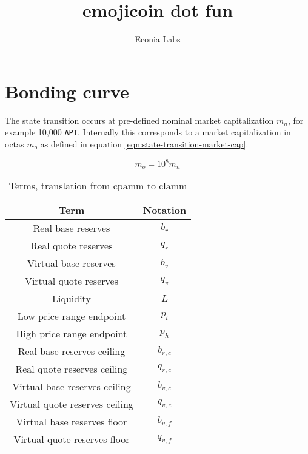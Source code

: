 \documentclass[table, twocolumn]{article}
\title{emojicoin dot fun}
\author{Econia Labs}
\date{}
\begin{document}
\maketitle

\section{Bonding curve}

The state transition occurs at pre-defined nominal market capitalization $m_n$, for
example 10,000 \texttt{APT}. Internally this corresponds to a market capitalization in
octas $m_o$ as defined in equation \ref{eqn:state-transition-market-cap}.

\begin{equation} \label{eqn:state-transition-market-cap}
  m_o = 10^8 m_n
\end{equation}

\begin{table}[!htb]
  \centering
  \begin{tabular}{|c|c|}
    \hline \rowcolor{blue}
    Term                           & Notation  \\ \hline
    Real base reserves             & $b_r$     \\ \hline
    Real quote reserves            & $q_r$     \\ \hline
    Virtual base reserves          & $b_v$     \\ \hline
    Virtual quote reserves         & $q_v$     \\ \hline
    Liquidity                      & $L$       \\ \hline
    Low price range endpoint       & $p_l$     \\ \hline
    High price range endpoint      & $p_h$     \\ \hline
    Real base reserves ceiling     & $b_{r,c}$ \\ \hline
    Real quote reserves ceiling    & $q_{r,c}$ \\ \hline
    Virtual base reserves ceiling  & $b_{v,c}$ \\ \hline
    Virtual quote reserves ceiling & $q_{v,c}$ \\ \hline
    Virtual base reserves floor    & $b_{v,f}$ \\ \hline
    Virtual quote reserves floor   & $q_{v,f}$ \\ \hline
  \end{tabular}
  \caption{Terms, translation from \gls{cpamm} to \gls{clamm}}
  \label{tab:clamm-curve-translation}
\end{table}
\end{document}
